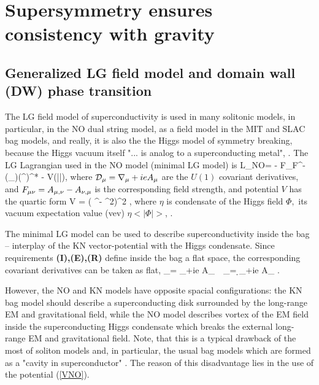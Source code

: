 \documentclass[aps,prd,twocolumn,showpacs]{revtex4}
\begin{document}
\section{Supersymmetry  ensures consistency with gravity}

\subsection{Generalized LG field model and  domain wall (DW) phase transition}
 The  LG field model of superconductivity is used in many solitonic models, in particular, in the  NO dual string model, as a field model in the MIT and SLAC bag models, and really, it is  also the the Higgs model of symmetry breaking, because
 the Higgs vacuum itself  "... is analog to a superconducting metal", \cite{Dash}.
  The LG Lagrangian used in the NO model (minimal LG model) is
 \be
{\cal L}_{NO}= - F_\mn F^\mn -  (\cD_\m \Phi)(\cD^\m \Phi)^* - V(|\Phi|),
\label{LNO}\ee where $ {\cal D}_\mu = \nabla_\mu +ie A_\mu $  are the $U(1)$ covariant derivatives, and
$F_{\mu\nu} = A_{\mu,\nu} - A_{\nu,\mu} $ is the corresponding field strength, and potential $V$ has  the
quartic form \be V = \lambda ( \Phi ^\dag \Phi - \eta^2)^2 , \label{VNO} \ee
  where $\eta$ is condensate of the Higgs field  $\Phi ,$ its vacuum expectation value (vev) $\eta <|\Phi|> $, \cite{NO}.

The minimal LG model can be used to describe superconductivity inside the bag -- interplay of the KN vector-potential with the Higgs condensate.
 Since requirements \textbf{(I),(E),(R)} define inside the bag a flat space, the corresponding covariant derivatives can be taken as flat,
\be \cD_\m =
\nabla_\m +ie A_\m \ \rightarrow \ \cD_\m = \d_\m +ie A_\m \label{Dflat} . \ee

However, the NO and KN models have opposite spacial configurations: the KN bag model should describe a superconducting disk surrounded by the long-range EM and gravitational field, while the NO model describes vortex of the EM field inside the superconducting Higgs condensate which breaks the external long-range EM and gravitational field.
 Note, that this is a typical drawback of the most of soliton models and, in particular,  the usual bag models which are formed as a "cavity in superconductor" \cite{Dash}. The reason of this disadvantage lies in the use of the
potential (\ref{VNO}).
\end{document}
